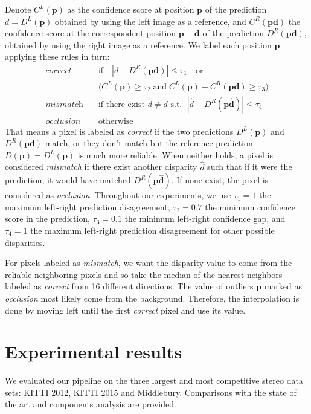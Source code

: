 \documentclass[10pt, twocolumn, letterpaper]{article}
\begin{document}
Denote $C^{L}(\mathbf{p})$ as the confidence score at position $\mathbf{p}$ of the prediction $d = D^{L}(\mathbf{p})$ obtained by using the left image as a reference, and  $C^{R}(\mathbf{pd})$ the confidence score at the correspondent position $\mathbf{p-d}$ of the prediction $D^{R}(\mathbf{pd})$, obtained by using the right image as a reference.
We label each position $\mathbf{p}$ applying these rules in turn:
\begin{align*}
 \textit{correct}  & \quad \mbox{if} \quad |d - D^{R}(\mathbf{pd})| \leq \tau_1  \quad \mbox{or} \\
  & \quad  \big(C^{L}(\mathbf{p}) \geq \tau_2 \; \mbox{and} \; C^{L}(\mathbf{p}) - C^{R}(\mathbf{pd}) \geq \tau_3 \big) \\
   \textit{mismatch} & \quad \mbox{if there exist $\hat{d} \neq d$ s.t. } \; |\hat{d} - D^{R}(\mathbf{p\hat{d}})| \leq \tau_{4} \\
   \textit{occlusion} & \quad \text{otherwise}
\end{align*} 
That means a pixel is labeled as \textit{correct} if the two predictions $D^{L}(\mathbf{p})$ and $D^{R}(\mathbf{pd})$ match, or they don't match but the reference prediction $D(\mathbf{p})=D^L(\mathbf{p})$ is much more reliable.
When neither holds, a pixel is considered  \textit{mismatch} if there exist another disparity $\hat{d}$ such that if it were the prediction, it would have matched $D^{R}(\mathbf{p\hat{d}})$. If none exist, the pixel is considered as \textit{occlusion}.
Throughout our experiments, we use $\tau_1=1$ the maximum left-right prediction disagreement, $\tau_2=0.7$ the minimum confidence score in the prediction, $\tau_3=0.1$ the minimum left-right confidence gap, and $\tau_4=1$ the maximum left-right prediction disagreement for other possible disparities.

For pixels labeled as \textit{mismatch}, we want the disparity value to come from the reliable neighboring pixels and so take the median of the nearest neighbors labeled as \textit{correct} from 16 different directions. The value of outliers $\mathbf{p}$ marked as \textit{occlusion} most likely come from the background. Therefore, the interpolation is done by moving left until the first \textit{correct} pixel and use its value.



\section{Experimental results}
\label{sec:experiments}
We evaluated our pipeline on the three largest and most competitive stereo data sets: KITTI 2012, KITTI 2015 and Middlebury. Comparisons with the state of the art and components analysis are provided.
\end{document}
